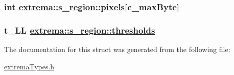 \hypertarget{structextrema_1_1s__region_733dea443b88f21ebb076daa57db365b}{
\subsubsection[pixels]{\setlength{\rightskip}{0pt plus 5cm}int \hyperlink{structextrema_1_1s__region_733dea443b88f21ebb076daa57db365b}{extrema::s\_\-region::pixels}\mbox{[}c\_\-max\-Byte\mbox{]}}}
\label{structextrema_1_1s__region_733dea443b88f21ebb076daa57db365b}


\hypertarget{structextrema_1_1s__region_2108fd34e92ccd680356907be7859dd6}{
\subsubsection[thresholds]{\setlength{\rightskip}{0pt plus 5cm}t\_\-LL \hyperlink{structextrema_1_1s__region_2108fd34e92ccd680356907be7859dd6}{extrema::s\_\-region::thresholds}}}
\label{structextrema_1_1s__region_2108fd34e92ccd680356907be7859dd6}




The documentation for this struct was generated from the following file:\begin{CompactItemize}
\item 
\hyperlink{extremaTypes_8h}{extrema\-Types.h}\end{CompactItemize}
